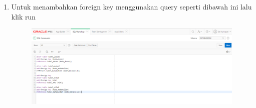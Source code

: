 \begin{enumerate}
	\item Untuk menambahkan foreign key menggunakan query seperti dibawah ini lalu klik run 
	\begin{figure} [!htbp]
	\includegraphics[scale=0.2]{Apex/a.png}
	\centering
	\end{figure}

\end{enumerate}
